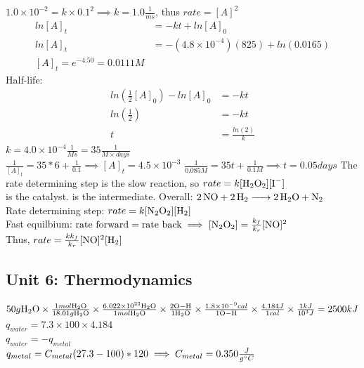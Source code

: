 \documentclass{article}
\begin{document}
\(1.0 \times 10^{-2} = k \times 0.1^2 \implies k = 1.0 \frac{1}{ms}\), thus \(rate = [A]^2\)
\AnswerSet
\begin{equation*}
    \begin{aligned}
    ln[A]_t &= -kt + ln[A]_0 \\
    ln[A]_t &= -(4.8 \times 10^{-4})(825) + ln(0.0165)\\
    [A]_t = e^{-4.50} = 0.0111M 
    \end{aligned}
\end{equation*}
Half-life:
\begin{equation*}
    \begin{aligned}
        ln(\frac{1}{2}[A]_0) - ln[A]_0 &= -kt \\
        ln(\frac{1}{2}) &= -kt \\
        t &= \frac{ln(2)}{k}
    \end{aligned}
\end{equation*}
\AnswerSet
\(k = 4.0 \times 10^{-4} \frac{1}{Ms} = 35\frac{1}{M\times days}\) \\
\(\frac{1}{[A]_t} = 35 * 6 + \frac{1}{0.1} \implies [A]_t = 4.5 \times 10^{-3}\)
\AnswerSet
\(\frac{1}{0.085M} = 35t + \frac{1}{0.1M} \implies t = 0.05days\)
\AnswerSet
{} 
The rate determining step is the slow reaction, so \(rate = k[\ce{H2O2}][\ce{I-}]\)\\
 is the catalyst.  is the intermediate. 
\AnswerSet
Overall: \(\ce{2NO + 2H2 -> 2H2O + N2} \)\\
Rate determining step: \(rate = k[\ce{N2O2}][\ce{H2}]\) \\
Fast equilbium: \(\text{rate forward} = \text{rate back} \implies [\ce{N2O2}] = \frac{k_f}{k_r}[\ce{NO}]^2\) \\
Thus, \(rate = \frac{kk_f}{k_r}[\ce{NO}]^2[\ce{H2}]\)
\subsection{Unit 6: Thermodynamics}
\AnswerSet
\(50g\ce{H2O}\times \frac{1mol\ce{H2O}}{18.01g\ce{H2O}} \times \frac{6.022\times 10^{23}\ce{H2O}}{1mol\ce{H2O}} \times \frac{2\ce{O-H}}{1\ce{H2O}} 
\times \frac{1.8 \times 10^{-9}cal}{1\ce{O-H}} \times \frac{4.184J}{1cal}\times\frac{1kJ}{10^3J} = 2500kJ\)
\AnswerSet
\(q_{water} = 7.3 \times 100 \times 4.184\) \\
\(q_{water} = -q_{metal}\)\\
\(q_{metal} = C_{metal} (27.3-100)*120 \implies C_{metal} = 0.350 \frac{J}{g\degree C}\)
\end{document}

